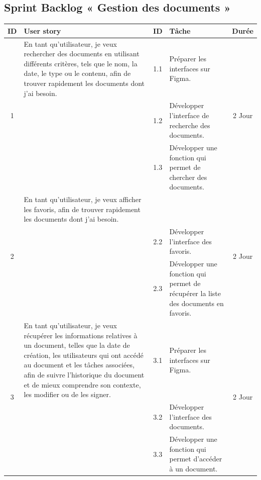 \pagebreak

\subsection{Sprint Backlog « Gestion des documents »}

\begin{adjustwidth}{-1cm}{}
    
    \begin{longtable}{|c|p{6cm}|c|p{6cm}|c|}
      \hline
      \textbf{ID} & \textbf{User story} & \textbf{ID}  & \textbf{Tâche} & \textbf{Durée} \\
      \hline
      \multirow{3}{*}{1} & En tant qu'utilisateur, je veux rechercher des documents en utilisant différents critères, tels que le nom, la date, le type ou le contenu, afin de trouver rapidement les documents dont j'ai besoin. & 1.1 & Préparer les interfaces sur Figma. & \multirow{3}{*}{2 Jour} \\
      \cline{3-4}
      & & 1.2 & Développer l'interface de recherche des documents. & \\
      \cline{3-4}
      & & 1.3 & Développer une fonction qui permet de chercher des documents. & \\
      \cline{1-5}
      \multirow{3}{*}{2} & En tant qu'utilisateur, je veux afficher les favoris, afin de trouver rapidement les documents dont j'ai besoin. &&& \multirow{3}{*}{2 Jour} \\
      \cline{3-4}
      & & 2.2 & Développer l'interface des favoris. & \\
      \cline{3-4}
      & & 2.3 & Développer une fonction qui permet de récupérer la liste des documents en favoris. & \\
      \cline{1-5}
      \multirow{3}{*}{3} & En tant qu'utilisateur, je veux récupérer les informations relatives à un document, telles que la date de création, les utilisateurs qui ont accédé au document et les tâches associées, afin de suivre l'historique du document et de mieux comprendre son contexte, les modifier ou de les signer. & 3.1 & Préparer les interfaces sur Figma. & \multirow{3}{*}{2 Jour} \\
      \cline{3-4}
      & & 3.2 & Développer l'interface des documents. & \\
      \cline{3-4}
      & & 3.3 & Développer une fonction qui permet d'accéder à un document. & \\

\end{longtable}
\end{adjustwidth}
